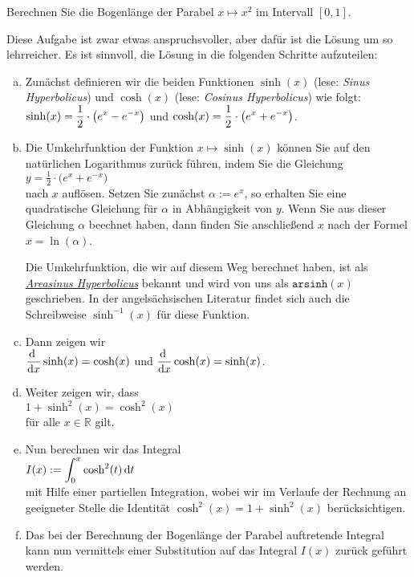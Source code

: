 \exercise
Berechnen Sie die Bogenl\"ange der Parabel $x \mapsto x^2$ im Intervall $[0,1]$. 

\hint
Diese Aufgabe ist zwar etwas anspruchsvoller, aber daf\"ur ist die L\"osung um so lehrreicher.  Es ist
sinnvoll, die L\"osung in die folgenden Schritte aufzuteilen:
\begin{enumerate}[(a)]
\item Zun\"achst definieren wir die beiden Funktionen $\sinh(x)$ (lese: \emph{Sinus Hyperbolicus}) und
      $\cosh(x)$ (lese: \emph{Cosinus Hyperbolicus}) wie folgt:
      \\[0.2cm]
      \hspace*{1.3cm}
      $\displaystyle\sinh(x) = \frac{1}{2} \cdot \bigl(e^x - e^{-x}\bigr)$ \quad und \quad
      $\displaystyle\cosh(x) = \frac{1}{2} \cdot \bigl(e^x + e^{-x}\bigr)$. 
\item Die Umkehrfunktion der Funktion $x \mapsto \sinh(x)$ k\"onnen Sie auf den nat\"urlichen
      Logarithmus zur\"uck f\"uhren, indem Sie die Gleichung
      \\[0.2cm]
      \hspace*{1.3cm}
      $y = \frac{1}{2} \cdot \bigl(e^x + e^{-x}\bigr)$
      \\[0.2cm]
      nach $x$ aufl\"osen.  Setzen Sie zun\"achst $\alpha := e^x$, so erhalten Sie eine quadratische
      Gleichung f\"ur $\alpha$ in Abh\"angigkeit von $y$.  Wenn Sie aus dieser Gleichung $\alpha$
      beechnet haben, dann finden Sie anschlie{\ss}end $x$ nach der Formel $x = \ln(\alpha)$.

      Die Umkehrfunktion, die wir auf diesem Weg berechnet haben, ist als 
      \href{https://de.wikipedia.org/wiki/Areasinus_Hyperbolicus_und_Areakosinus_Hyperbolicus}{\emph{Areasinus Hyperbolicus}}
      bekannt und wird von uns als $\mathtt{arsinh}(x)$ geschrieben.  In der angels\"achsischen
      Literatur findet sich auch die Schreibweise $\sinh^{-1}(x)$ f\"ur diese Funktion.
\item Dann zeigen wir
      \\[0.2cm]
      \hspace*{1.3cm}
      $\displaystyle\frac{\textrm{d}\;}{\textrm{d}x} \sinh(x) = \cosh(x)$ \quad und \quad $\displaystyle\frac{\textrm{d}\;}{\textrm{d}x} \cosh(x) = \sinh(x)$.
\item Weiter zeigen wir, dass
      \\[0.2cm]
      \hspace*{1.3cm}
      $1 + \sinh^2(x) = \cosh^2(x)$
      \\[0.2cm]
      f\"ur alle $x\in \mathbb{R}$ gilt.
\item Nun berechnen wir das Integral
      \\[0.2cm]
      \hspace*{1.3cm}
      $\displaystyle I(x) := \int_0^x \cosh^2(t)\, \textrm{d} t$
      \\[0.2cm]
      mit Hilfe einer partiellen Integration, wobei wir im Verlaufe der Rechnung an geeigneter
      Stelle die Identit\"at $\cosh^2(x) = 1 + \sinh^2(x)$ ber\"ucksichtigen. 
\item Das bei der Berechnung der Bogenl\"ange der Parabel auftretende Integral kann nun vermittels einer
      Substitution auf das Integral $I(x)$ zur\"uck gef\"uhrt werden. \eod 
\end{enumerate}


